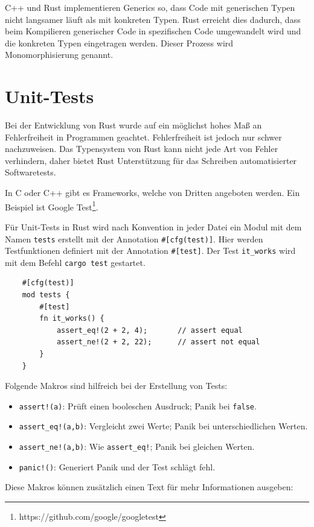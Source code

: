 C++ und Rust implementieren Generics so, dass Code mit generischen Typen nicht langsamer läuft als mit konkreten Typen. Rust erreicht dies dadurch, dass beim Kompilieren generischer Code in spezifischen Code umgewandelt wird und die konkreten Typen eingetragen werden. Dieser Prozess wird Monomorphisierung genannt.


\section{Unit-Tests}\label{chap:unittests}
Bei der Entwicklung von Rust wurde auf ein möglichst hohes Maß an Fehlerfreiheit in Programmen geachtet. Fehlerfreiheit ist jedoch nur schwer nachzuweisen. Das Typensystem von Rust kann nicht jede Art von Fehler verhindern, daher bietet Rust Unterstützung für das Schreiben automatisierter Softwaretests.

In C oder C++ gibt es Frameworks, welche von Dritten angeboten werden. Ein Beispiel ist Google Test\footnote{https://github.com/google/googletest}.

Für Unit-Tests in Rust wird nach Konvention in jeder Datei ein Modul mit dem Namen \verb"tests" erstellt mit der Annotation \verb"#[cfg(test)]". Hier werden Testfunktionen definiert mit der Annotation \verb"#[test]". Der Test \verb"it_works" wird mit dem Befehl \verb"cargo test" gestartet.

\begin{lstlisting}
    #[cfg(test)]
    mod tests {
        #[test]
        fn it_works() {
            assert_eq!(2 + 2, 4);       // assert equal
            assert_ne!(2 + 2, 22);      // assert not equal
        }
    }
\end{lstlisting}

Folgende Makros sind hilfreich bei der Erstellung von Tests:

\begin{itemize}
    \item \verb"assert!(a)": Prüft einen booleschen Ausdruck; Panik bei \verb"false".
    \item \verb"assert_eq!(a,b)": Vergleicht zwei Werte; Panik bei unterschiedlichen Werten.
    \item \verb"assert_ne!(a,b)": Wie \verb"assert_eq!"; Panik bei gleichen Werten.
    \item \verb"panic!()": Generiert Panik und der Test schlägt fehl.
\end{itemize}

Diese Makros können zusätzlich einen Text für mehr Informationen ausgeben:

